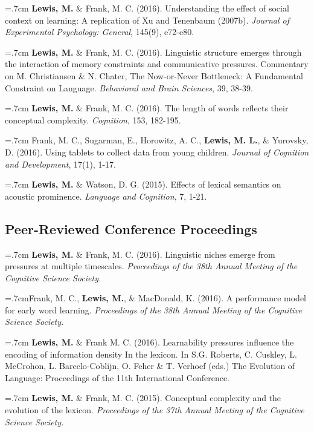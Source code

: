 \documentclass[letterpaper]{article}
\begin{document}
\onehalfspacing


  \hangindent=.7cm {\bf Lewis, M.} \& Frank, M. C. (2016). Understanding the effect of social context on learning: A replication of Xu and Tenenbaum (2007b). {\it Journal of Experimental Psychology: General}, 145(9), e72-e80.

 \hangindent=.7cm {\bf Lewis, M.} \& Frank, M. C. (2016). Linguistic structure emerges through the interaction of memory constraints and communicative pressures. Commentary on M. Christiansen \& N. Chater, The Now-or-Never Bottleneck: A Fundamental Constraint on Language. {\it Behavioral and Brain Sciences}, 39, 38-39.
 
  \hangindent=.7cm {\bf Lewis, M.} \& Frank, M. C. (2016). The length of words reflects their conceptual complexity. {\it Cognition}, 153, 182-195.

 \hangindent=.7cm Frank, M. C., Sugarman, E., Horowitz, A. C., {\bf Lewis, M. L.}, \& Yurovsky, D. (2016). Using tablets to collect data from young children. {\it Journal of Cognition and Development}, 17(1), 1-17. 
 
  \hangindent=.7cm {\bf Lewis, M.} \& Watson, D. G. (2015). Effects of lexical semantics on acoustic prominence. { \it Language and Cognition}, 7, 1-21. 

  
  \subsection*{Peer-Reviewed Conference Proceedings} 
  \hangindent=.7cm {\bf Lewis, M.} \& Frank, M. C. (2016). Linguistic niches emerge from pressures at multiple timescales. { \it Proceedings of the 38th Annual Meeting of the Cognitive Science Society.}

   \hangindent=.7cmFrank, M. C.,  {\bf Lewis, M.}, \& MacDonald, K. (2016). A performance model for early word learning.  { \it Proceedings of the 38th Annual Meeting of the Cognitive Science Society.}

  \hangindent=.7cm {\bf Lewis, M.} \& Frank M. C. (2016). Learnability pressures influence the encoding of information density In the lexicon. In S.G. Roberts, C. Cuskley, L. McCrohon, L. Barcelo-Coblijn, O. Feher \& T. Verhoef (eds.) The Evolution of Language: Proceedings of the 11th International Conference.


 \hangindent=.7cm {\bf Lewis, M.} \& Frank, M. C. (2015). Conceptual complexity and the evolution of the lexicon. { \it Proceedings of the 37th Annual Meeting of the Cognitive Science Society.}
 
\end{document}
